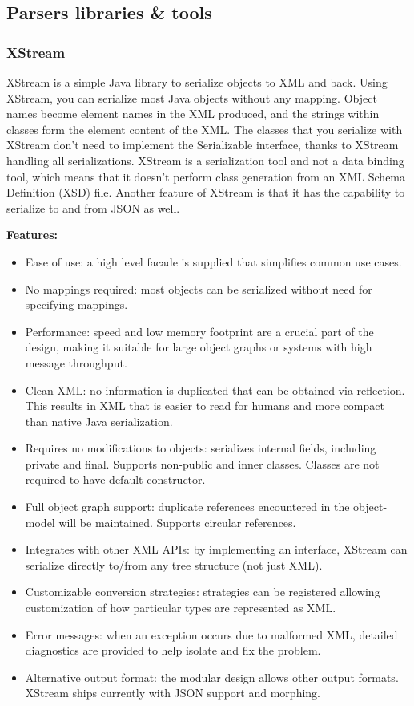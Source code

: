 \subsection{Parsers libraries \& tools}

\subsubsection{XStream}
XStream is a simple Java library to serialize objects to XML and back. Using XStream, you can serialize most Java objects without any mapping. Object names become element names in the XML produced, and the strings within classes form the element content of the XML.
\newline
\newline
The classes that you serialize with XStream don't need to implement the Serializable interface, thanks to XStream handling all serializations. XStream is a serialization tool and not a data binding tool, which means that it doesn't perform class generation from an XML Schema Definition (XSD) file.
\newline
\newline
Another feature of XStream is that it has the capability to serialize to and from JSON as well.

\textbf{Features:}
\begin{itemize}
\item{}Ease of use: a high level facade is supplied that simplifies common use cases.
\item{}No mappings required: most objects can be serialized without need for specifying mappings.
\item{}Performance: speed and low memory footprint are a crucial part of the design, making it suitable for large object graphs or systems with high message throughput.
\item{}Clean XML: no information is duplicated that can be obtained via reflection. This results in XML that is easier to read for humans and more compact than native Java serialization.
\item{}Requires no modifications to objects: serializes internal fields, including private and final. Supports non-public and inner classes. Classes are not required to have default constructor.
\item{}Full object graph support: duplicate references encountered in the object-model will be maintained. Supports circular references.
\item{}Integrates with other XML APIs: by implementing an interface, XStream can serialize directly to/from any tree structure (not just XML).
\item{}Customizable conversion strategies: strategies can be registered allowing customization of how particular types are represented as XML.
\item{}Error messages: when an exception occurs due to malformed XML, detailed diagnostics are provided to help isolate and fix the problem.
\item{}Alternative output format: the modular design allows other output formats. XStream ships currently with JSON support and morphing.
\end{itemize}

